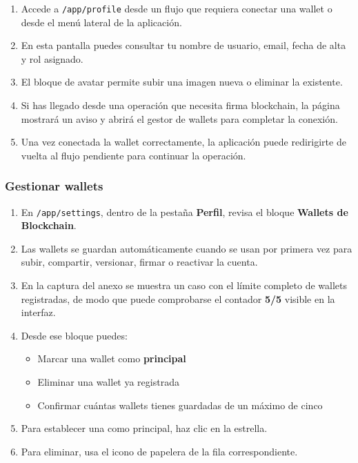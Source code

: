 \documentclass[11pt, a4paper]{article}
\begin{document}
\begin{enumerate}
    \item Accede a \texttt{/app/profile} desde un flujo que requiera conectar una wallet o desde el menú lateral de la aplicación.
    \item En esta pantalla puedes consultar tu nombre de usuario, email, fecha de alta y rol asignado.
    \item El bloque de avatar permite subir una imagen nueva o eliminar la existente.
    \item Si has llegado desde una operación que necesita firma blockchain, la página mostrará un aviso y abrirá el gestor de wallets para completar la conexión.
    \item Una vez conectada la wallet correctamente, la aplicación puede redirigirte de vuelta al flujo pendiente para continuar la operación.
\end{enumerate}

\subsubsection{Gestionar wallets}

\begin{enumerate}
    \item En \texttt{/app/settings}, dentro de la pestaña \textbf{Perfil}, revisa el bloque \textbf{Wallets de Blockchain}.
    \item Las wallets se guardan automáticamente cuando se usan por primera vez para subir, compartir, versionar, firmar o reactivar la cuenta.
    \item En la captura del anexo se muestra un caso con el límite completo de wallets registradas, de modo que puede comprobarse el contador \textbf{5/5} visible en la interfaz.
    \item Desde ese bloque puedes:
    \begin{itemize}
        \item Marcar una wallet como \textbf{principal}
        \item Eliminar una wallet ya registrada
        \item Confirmar cuántas wallets tienes guardadas de un máximo de cinco
    \end{itemize}
    \item Para establecer una como principal, haz clic en la estrella.
    \item Para eliminar, usa el icono de papelera de la fila correspondiente.
\end{enumerate}
\end{document}
